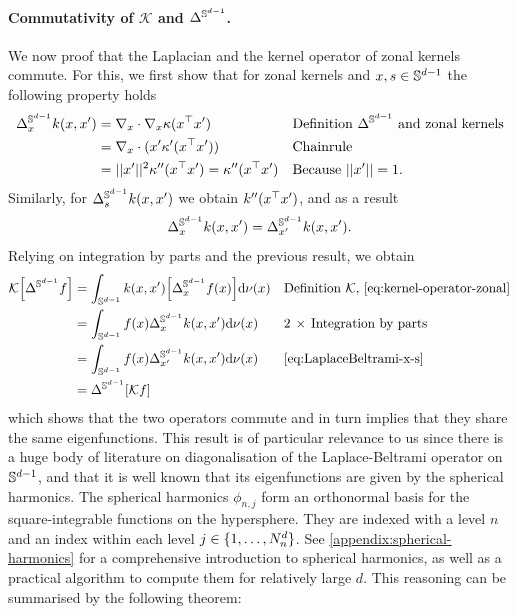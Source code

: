 \paragraph{Commutativity of $\mathcal{K}$ and $\Delta^{\mathbb{S}^{d-1}}$.}
We now proof that the Laplacian and the kernel operator of zonal kernels commute. For this, we first show that for zonal kernels and $x,s \in \mathbb{S}^{d-1}$ the following property holds
\begin{align}
    \Delta^{\mathbb{S}^{d-1}}_x k(x, x') 
     &= \nabla_x \cdot \nabla_x \kappa(x^{\top} x') && \text{Definition $\Delta^{\mathbb{S}^{d-1}}$ and zonal kernels}\\
     &= \nabla_x \cdot (x' \kappa'(x^{\top} x'))  && \text{Chainrule} \\
     &= \lvert\lvert x'\rvert\rvert^2 \kappa''(x^{\top} x') = \kappa''(x ^{\top} x') && \text{Because } \lvert\lvert x'\rvert\rvert = 1.
\end{align}
Similarly, for $\Delta^{\mathbb{S}^{d-1}}_s k(x, x')$ we obtain $k''(x ^{\top} x')$, and as a result
\begin{equation}
    \label{eq:LaplaceBeltrami-x-s}
\Delta^{\mathbb{S}^{d-1}}_x k(x, x') = \Delta^{\mathbb{S}^{d-1}}_{x'} k(x, x').
\end{equation}
Relying on integration by parts and the previous result, we obtain
\begin{align}
    \mathcal{K} \left[\LaplaceBeltrami f\right] &= \int_{\dsphere} k(x, x') \left[\LaplaceBeltrami_x f(x)\right] \calcd{\nu(x)} && \text{Definition $\mathcal{K}$, \cref{eq:kernel-operator-zonal}}\\
    &= \int_{\dsphere} f(x) \LaplaceBeltrami_x k(x, x')  \calcd{\nu(x)} && 2\,\times\,\text{Integration by parts}\\
    &= \int_{\dsphere} f(x) \LaplaceBeltrami_{x'} k(x, x')  \calcd{\nu(x)}  && \text{\cref{eq:LaplaceBeltrami-x-s}} \\
    &= \LaplaceBeltrami \left[ \mathcal{K} f \right]
\end{align}
which shows that the two operators commute and in turn implies that they share the same eigenfunctions. This result is of particular relevance to us since there is a huge body of literature on diagonalisation of the Laplace-Beltrami operator on $\mathbb{S}^{d-1}$, and that it is well known that its eigenfunctions are given by the spherical harmonics. The spherical harmonics $\phi_{n,j}$ form an orthonormal basis for the square-integrable functions on the hypersphere. They are indexed with a level $n$ and an index within each level $j \in \{1, \dots, N^d_n\}$. See \cref{appendix:spherical-harmonics} for a comprehensive introduction to spherical harmonics, as well as a practical algorithm to compute them for relatively large $d$. This reasoning can be summarised by the following theorem:
